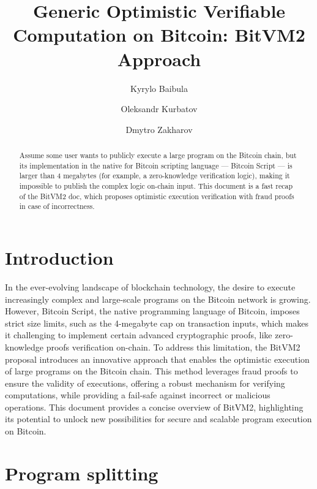 \documentclass{iacrtrans}
\author{Kyrylo Baibula \inst{1} \and Oleksandr Kurbatov\inst{1} \and Dmytro Zakharov\inst{1}}
\institute{Distributed Lab \email{dmytro.zakharov@distributedlab.com}, \email{ok@distributedlab.com}, \email{kyrylo.baybula@distributedlab.com}}
\title[Verifiable Computation on Bitcoin]{Generic Optimistic Verifiable Computation on Bitcoin: BitVM2 Approach}
\begin{document}
\maketitle


\begin{abstract}
  Assume some user wants to publicly execute a large program on the
  Bitcoin chain, but its implementation in the native for Bitcoin
  scripting language --- Bitcoin Script --- is larger than 4 megabytes
  (for example, a zero-knowledge verification logic), making it
  impossible to publish the complex logic on-chain input. This
  document is a fast recap of the BitVM2 doc, which proposes
  optimistic execution verification with fraud proofs in case of
  incorrectness.
\end{abstract}

\setcounter{tocdepth}{2}
\tableofcontents

\section{Introduction}\label{sec:intro}

In the ever-evolving landscape of blockchain technology, the desire to
execute increasingly complex and large-scale programs on the
Bitcoin\autocite{bitcoin_paper} network is growing. However, Bitcoin
Script, the native programming language of Bitcoin, imposes strict
size limits, such as the 4-megabyte cap on transaction inputs, which
makes it challenging to implement certain advanced cryptographic
proofs, like zero-knowledge proofs verification on-chain. To address
this limitation, the BitVM2\autocite{bitvm2} proposal introduces an
innovative approach that enables the optimistic execution of large
programs on the Bitcoin chain. This method leverages fraud proofs to
ensure the validity of executions, offering a robust mechanism for
verifying computations, while providing a fail-safe against incorrect
or malicious operations. This document provides a concise overview of
BitVM2, highlighting its potential to unlock new possibilities for
secure and scalable program execution on Bitcoin.

\section{Program splitting}\label{sec:program-splitting}
\end{document}
